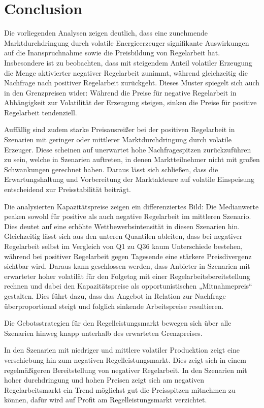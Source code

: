 \chapter{Conclusion}

Die vorliegenden Analysen zeigen deutlich, dass eine zunehmende Marktdurchdringung durch volatile Energieerzeuger
signifikante Auswirkungen auf die Inanspruchnahme sowie die Preisbildung von Regelarbeit hat.
Insbesondere ist zu beobachten, dass mit steigendem Anteil volatiler Erzeugung die Menge aktivierter negativer Regelarbeit zunimmt,
während gleichzeitig die Nachfrage nach positiver Regelarbeit zurückgeht. Dieses Muster spiegelt sich auch in den Grenzpreisen wider:
Während die Preise für negative Regelarbeit in Abhängigkeit zur Volatilität der Erzeugung steigen, sinken die Preise für positive
Regelarbeit tendenziell.

Auffällig sind zudem starke Preisausreißer bei der positiven Regelarbeit in Szenarien mit geringer oder mittlerer Marktdurchdringung
durch volatile Erzeuger. Diese scheinen auf unerwartet hohe Nachfragespitzen zurückzuführen zu sein, welche in Szenarien auftreten,
in denen Marktteilnehmer nicht mit großen Schwankungen gerechnet haben. Daraus lässt sich schließen, dass die Erwartungshaltung und
Vorbereitung der Marktakteure auf volatile Einspeisung entscheidend zur Preisstabilität beiträgt.

Die analysierten Kapazitätspreise zeigen ein differenziertes Bild: Die Medianwerte peaken sowohl für positive als auch negative
Regelarbeit im mittleren Szenario. Dies deutet auf eine erhöhte Wettbewerbsintensität in diesen Szenarien hin. Gleichzeitig
lässt sich aus den unteren Quantilen ableiten, dass bei negativer Regelarbeit selbst im Vergleich von Q1 zu Q36 kaum Unterschiede
bestehen, während bei positiver Regelarbeit gegen Tagesende eine stärkere Preisdivergenz sichtbar wird. Daraus kann geschlossen werden,
dass Anbieter in Szenarien mit erwarteter hoher volatilät für den Folgetag mit einer Regelarbeitsbereitstellung rechnen und dabei den Kapazitätspreise
als opportunistischen  „Mitnahmepreis“ gestalten. Dies führt dazu, dass das Angebot in Relation zur Nachfrage überproportional
steigt und folglich sinkende Arbeitspreise resultieren.

Die Gebotsstrategien für den Regelleistungsmarkt bewegen sich über alle Szenarien hinweg knapp unterhalb des erwarteten Grenzpreises.

In den Szenarien mit niedriger und mittlere volatiler Producktion zeigt eine verschiebung hin zum negativen Regelleistungsmarkt. Dies zeigt sich
in einem regelmäßigeren Bereitstellung von negativer Regelarbeit. In den Szenarien mit hoher durchdringung und hohen Preisen zeigt sich
am negativen Regelarbeitsmarkt ein Trend möglichst gut die Preisspitzen mitnehmen zu können, dafür wird auf Profit am Regelleistungsmarkt
verzichtet.




